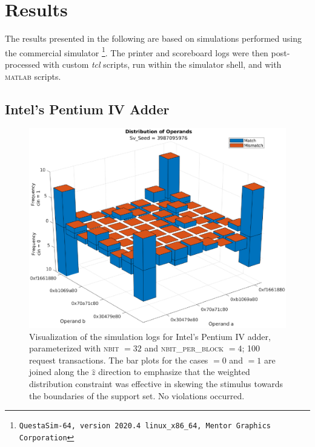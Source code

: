 \section{Results}\label{sec:results}
The results presented in the following are based on simulations performed using the commercial simulator \questa\footnote{\texttt{QuestaSim-64, version 2020.4 linux\_x86\_64, Mentor Graphics Corporation}}. The printer and scoreboard logs were then post-processed with custom \emph{tcl} scripts, run within the simulator shell, and with \textsc{matlab} scripts.

\subsection{Intel's Pentium IV Adder}

\begin{figure}
    \centering
\includegraphics[width=.9\linewidth]{fig/p4_adder/p4_adder_nbit32_nbit_per_block4.eps}
    \caption{Visualization of the simulation logs for Intel's Pentium IV adder, parameterized with \textsc{nbit} $= 32$ and \textsc{nbit\_per\_block} $= 4$; 100 request transactions. The bar plots for the cases  $= 0$ and  $= 1$ are joined along the $\hat{z}$ direction to emphasize that the weighted distribution constraint was effective in skewing the stimulus towards the boundaries of the support set. No violations occurred.}
    \label{fig:p4-sim324}
\end{figure}

